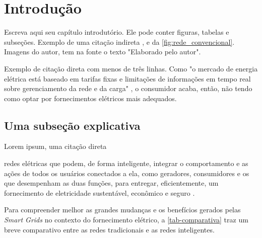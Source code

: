 \chapter[Introdução]{Introdução}
\label{ch:introdução}

Escreva aqui seu capítulo introdutório. Ele pode conter figuras, tabelas e subseções. Exemplo de uma citação indireta \cite{yu2011new}, e da \autoref{fig:rede_convencional}. Imagens do autor, tem na fonte o texto "Elaborado pelo autor".


Exemplo de citação direta com menos de três linhas. Como "o mercado de energia elétrica está baseado em tarifas fixas e limitações de informações em tempo real sobre gerenciamento da rede e da carga" \cite[p. 15]{cgee}, o consumidor acaba, então, não tendo como optar por fornecimentos elétricos mais adequados.


\section{Uma subseção explicativa}

Lorem ipsum, uma citação direta 

\begin{citacao}[brazil]
[...] redes elétricas que podem, de forma inteligente, integrar o comportamento e as ações de todos os usuários conectados a ela, como geradores, consumidores e os que desempenham as duas funções, para entregar, eficientemente, um fornecimento de eletricidade sustentável, econômico e seguro \cite[p. 51, tradução livre]{yu2011new}.
\end{citacao}

Para compreender melhor as grandes mudanças e os benefícios gerados pelas \textit{Smart Grids} no contexto do fornecimento elétrico, a \autoref{tab-comparativa} traz um breve comparativo entre as redes tradicionais e as redes inteligentes.

